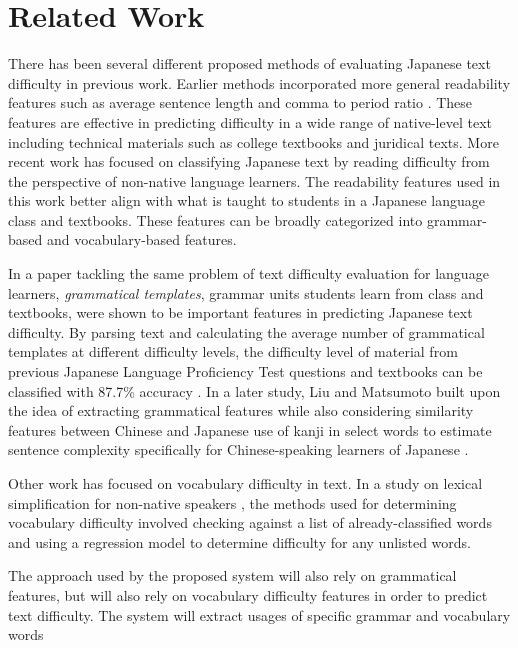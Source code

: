 \documentclass[12pt, a4paper]{article}
\begin{document}
\section{Related Work}

There has been several different proposed methods of evaluating Japanese text difficulty in previous work. 
Earlier methods incorporated more general readability features such as average sentence length and 
comma to period ratio \citep{computerReadabilityFormula}. These features are effective in predicting difficulty
in a wide range of native-level text including technical materials such as college textbooks and juridical texts.
More recent work has focused on classifying Japanese text by reading difficulty from the perspective 
of non-native language learners. The readability features 
used in this work better align with what is taught to students in a Japanese language class and textbooks.
These features can be broadly categorized into grammar-based and vocabulary-based features. 
\par
In a paper tackling the same problem of text difficulty evaluation for language learners, \textit{grammatical templates}, 
grammar units students learn from class and textbooks, were shown to be important 
features in predicting Japanese text difficulty. By parsing text and calculating the average number of 
grammatical templates at different difficulty levels, the difficulty level
of material from previous Japanese Language Proficiency Test questions and textbooks 
can be classified with 87.7\% accuracy \citep{grammarTemplate}. In a later study, Liu and Matsumoto built upon 
the idea of extracting grammatical features while also considering similarity features between
Chinese and Japanese use of kanji in select words to estimate sentence complexity specifically for 
Chinese-speaking learners of Japanese \citep{chineseSpeaker}. 
\par
Other work has focused on vocabulary difficulty in text. In a study on lexical simplification for non-native speakers \citep{wordRegression},
the methods used for determining vocabulary difficulty involved checking against a list of already-classified words and
using a regression model to determine difficulty for any unlisted words.  
\par
The approach used by the proposed system will also rely on grammatical features, but will also 
rely on vocabulary difficulty features in order to predict text difficulty. The system will extract 
usages of specific grammar and vocabulary words 
\end{document}

